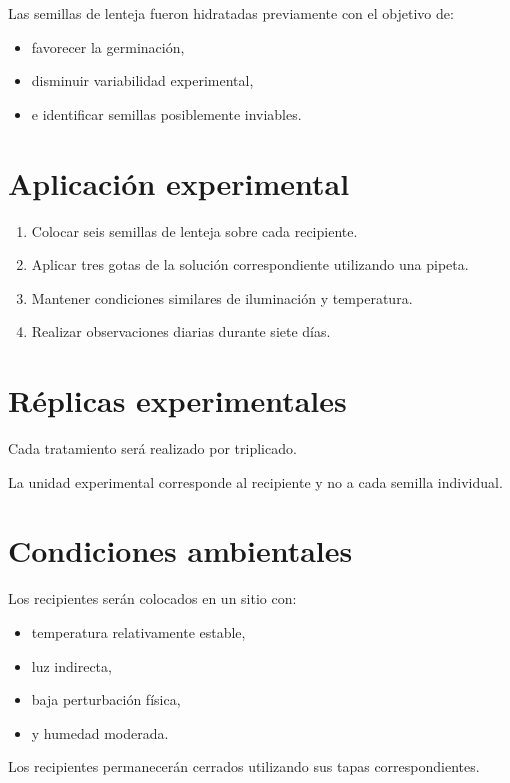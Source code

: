 \documentclass[compacto,10pt,comentarios]{aleph-notas}
\begin{document}
Las semillas de lenteja fueron hidratadas previamente con el objetivo de:

\begin{itemize}
\item favorecer la germinación,
\item disminuir variabilidad experimental,
\item e identificar semillas posiblemente inviables.
\end{itemize}

\section{Aplicación experimental}

\begin{enumerate}
\item Colocar seis semillas de lenteja sobre cada recipiente.
\item Aplicar tres gotas de la solución correspondiente utilizando una pipeta.
\item Mantener condiciones similares de iluminación y temperatura.
\item Realizar observaciones diarias durante siete días.
\end{enumerate}

\section{Réplicas experimentales}

Cada tratamiento será realizado por triplicado.

La unidad experimental corresponde al recipiente y no a cada semilla individual.

\section{Condiciones ambientales}

Los recipientes serán colocados en un sitio con:

\begin{itemize}
\item temperatura relativamente estable,
\item luz indirecta,
\item baja perturbación física,
\item y humedad moderada.
\end{itemize}

Los recipientes permanecerán cerrados utilizando sus tapas correspondientes.
\end{document}
